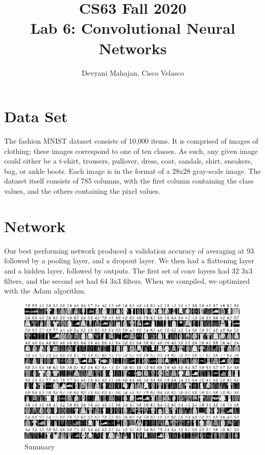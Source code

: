 \documentclass[11pt]{article}
\title{CS63 Fall 2020\\Lab 6: Convolutional Neural Networks}
\author{Devyani Mahajan, Cisco Velasco}%
\date{}
\begin{document}

\maketitle

\section{Data Set}

The fashion MNIST dataset consists of 10,000 items. It is comprised of images of
clothing; these images correspond to one of ten classes. As such, any given image
could either be a t-shirt, trousers, pullover, dress, coat, sandals, shirt, sneakers,
bag, or ankle boots. Each image is in the format of a 28x28 gray-scale image. The dataset
itself consists of 785 columns, with the first column containing the class values,
and the others containing the pixel values.


\section{Network}

Our best performing network produced a validation accuracy of averaging at
93%
followed by a pooling layer, and a dropout layer. We then had a flattening layer
and a hidden layer, followed by outputs.
The first set of conv layers had 32 3x3 filters, and the second set had 64 3x3 filters.
When we compiled, we optimized with the Adam algorithm.

\begin{figure}
    \includegraphics[width=\linewidth]{sum.png}
    \caption{Summary}
    \label{fig:Summary}
\end{figure}
\end{document}
